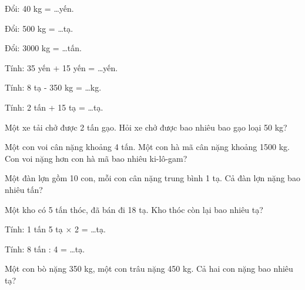 \begin{ex}
Đổi: 40 kg = \dots yến.
\end{ex}

\begin{ex}
Đổi: 500 kg = \dots tạ.
\end{ex}

\begin{ex}
Đổi: 3000 kg = \dots tấn.
\end{ex}

\begin{ex}
Tính: 35 yến + 15 yến = \dots yến.
\end{ex}

\begin{ex}
Tính: 8 tạ - 350 kg = \dots kg.
\end{ex}

\begin{ex}
Tính: 2 tấn + 15 tạ = \dots tạ.
\end{ex}

\begin{ex}
Một xe tải chở được 2 tấn gạo. Hỏi xe chở được bao nhiêu bao gạo loại 50 kg?
\end{ex}

\begin{ex}
Một con voi cân nặng khoảng 4 tấn. Một con hà mã cân nặng khoảng 1500 kg. Con voi nặng hơn con hà mã bao nhiêu ki-lô-gam?
\end{ex}

\begin{ex}
Một đàn lợn gồm 10 con, mỗi con cân nặng trung bình 1 tạ. Cả đàn lợn nặng bao nhiêu tấn?
\end{ex}

\begin{ex}
Một kho có 5 tấn thóc, đã bán đi 18 tạ. Kho thóc còn lại bao nhiêu tạ?
\end{ex}

\begin{ex}
Tính: 1 tấn 5 tạ $\times$ 2 = \dots tạ.
\end{ex}

\begin{ex}
Tính: 8 tấn : 4 = \dots tạ.
\end{ex}

\begin{ex}
Một con bò nặng 350 kg, một con trâu nặng 450 kg. Cả hai con nặng bao nhiêu tạ?
\end{ex}
